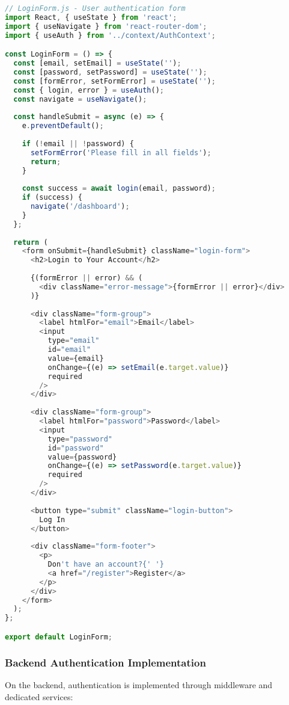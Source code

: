 \documentclass[12pt,a4paper]{article}
\begin{document}
\begin{lstlisting}[language=JavaScript]
// LoginForm.js - User authentication form
import React, { useState } from 'react';
import { useNavigate } from 'react-router-dom';
import { useAuth } from '../context/AuthContext';

const LoginForm = () => {
  const [email, setEmail] = useState('');
  const [password, setPassword] = useState('');
  const [formError, setFormError] = useState('');
  const { login, error } = useAuth();
  const navigate = useNavigate();
  
  const handleSubmit = async (e) => {
    e.preventDefault();
    
    if (!email || !password) {
      setFormError('Please fill in all fields');
      return;
    }
    
    const success = await login(email, password);
    if (success) {
      navigate('/dashboard');
    }
  };
  
  return (
    <form onSubmit={handleSubmit} className="login-form">
      <h2>Login to Your Account</h2>
      
      {(formError || error) && (
        <div className="error-message">{formError || error}</div>
      )}
      
      <div className="form-group">
        <label htmlFor="email">Email</label>
        <input
          type="email"
          id="email"
          value={email}
          onChange={(e) => setEmail(e.target.value)}
          required
        />
      </div>
      
      <div className="form-group">
        <label htmlFor="password">Password</label>
        <input
          type="password"
          id="password"
          value={password}
          onChange={(e) => setPassword(e.target.value)}
          required
        />
      </div>
      
      <button type="submit" className="login-button">
        Log In
      </button>
      
      <div className="form-footer">
        <p>
          Don't have an account?{' '}
          <a href="/register">Register</a>
        </p>
      </div>
    </form>
  );
};

export default LoginForm;
\end{lstlisting}

\subsubsection{Backend Authentication Implementation}
On the backend, authentication is implemented through middleware and dedicated services:
\end{document}
